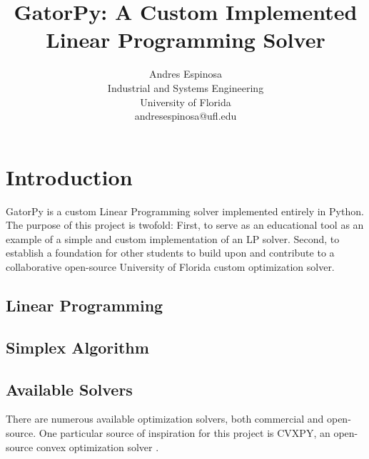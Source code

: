 \documentclass[conference]{IEEEtran}
\begin{document}
\title{GatorPy: A Custom Implemented Linear Programming Solver}

\author{
    \begin{minipage}{0.50\textwidth}
        \centering
        \textcolor{uf_blue}{Andres Espinosa} \\
        \textcolor{uf_orange}{Industrial and Systems Engineering} \\
        \textcolor{uf_orange}{University of Florida} \\
        \textcolor{uf_orange}{andresespinosa@ufl.edu} \\ 
    \end{minipage}
}


\maketitle


\begin{abstract}

\end{abstract}

\IEEEpeerreviewmaketitle

\section{Introduction}
GatorPy is a custom Linear Programming solver implemented entirely in Python.
The purpose of this project is twofold: 
First, to serve as an educational tool as an example of a simple and custom implementation of an LP solver. 
Second, to establish a foundation for other students to build upon and contribute to a collaborative open-source University of Florida custom optimization solver.

\subsection{Linear Programming}


\subsection{Simplex Algorithm}

\subsection{Available Solvers}
There are numerous available optimization solvers, both commercial and open-source.
One particular source of inspiration for this project is CVXPY, an open-source convex optimization solver \cite{solvers:diamond2016cvxpy}.
\end{document}

